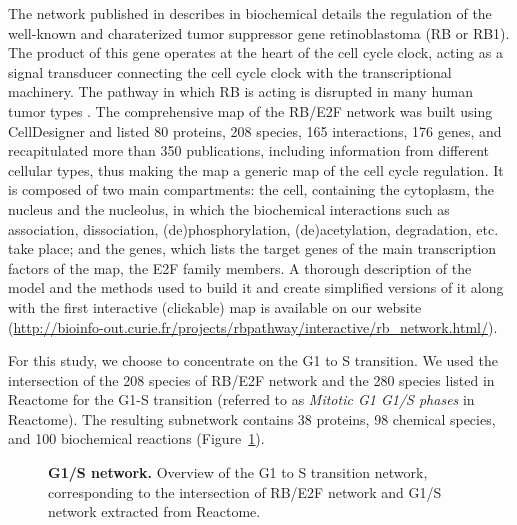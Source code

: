 \documentclass[10pt]{bmc_article}
\newenvironment{bmcformat}{\baselineskip20pt\sloppy\setboolean{publ}{false}}{\baselineskip20pt\sloppy}
\begin{document}
\begin{bmcformat}
The network published in \cite{calzone2008comprehensive} describes in
biochemical details the regulation of the well-known and charaterized tumor
suppressor gene retinoblastoma (RB or RB1). The product of this gene operates at
the heart of the cell cycle clock, acting as a signal transducer connecting the
cell cycle clock with the transcriptional machinery. The pathway in which RB is
acting is disrupted in many human tumor types \cite{weinberg1995retinoblastoma}.
The comprehensive map of the RB/E2F network was built using CellDesigner
\cite{funahashi2003celldesigner} and listed 80 proteins, 208 species, 165
interactions, 176 genes, and recapitulated more than 350 publications, including
information from different cellular types, thus making the map a generic map of
the cell cycle regulation. It is composed of two main compartments: the cell,
containing the cytoplasm, the nucleus and the nucleolus, in which the
biochemical interactions such as association, dissociation, (de)phosphorylation,
(de)acetylation, degradation, etc. take place; and the genes, which lists the
target genes of the main transcription factors of the map, the E2F family
members.
A thorough description of the model and the methods used to build it and create
simplified versions of it along with the first interactive (clickable) map is
available on our website
(\url{http://bioinfo-out.curie.fr/projects/rbpathway/interactive/rb_network.html/}).

For this study, we choose to concentrate on the G1 to S transition. We
used the intersection of the 208 species
of RB/E2F network and the 280 species listed in Reactome \cite{joshi2005reactome} for the G1-S transition
(referred to as \emph{Mitotic G1 G1/S phases} in Reactome). The resulting
subnetwork contains 38 proteins, 98 chemical species, and 100 biochemical
reactions (Figure~\ref{g1s}).

\begin{figure}[h]
 \caption{\label{g1s}  \textbf{G1/S network.}
	Overview of the G1 to S transition network, corresponding to the intersection of
RB/E2F network and G1/S network extracted from Reactome.}
\end{figure}


\end{bmcformat}
\end{document}
